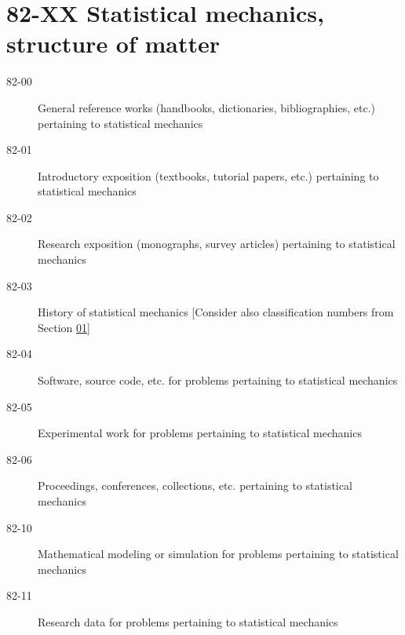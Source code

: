 \documentclass[letterpaper]{article}
\begin{document}
\section*{82-XX Statistical mechanics, structure of matter }\label{82-XX}
\begin{description}
\item [82-00]\label{82-00} General reference works (handbooks, dictionaries, bibliographies, etc.) pertaining to statistical mechanics
\item [82-01]\label{82-01} Introductory exposition (textbooks, tutorial papers, etc.) pertaining to statistical mechanics
\item [82-02]\label{82-02} Research exposition (monographs, survey articles) pertaining to statistical mechanics
\item [82-03]\label{82-03} History of statistical mechanics [Consider also classification numbers from Section \hyperref[01-XX]{01}]
\item [82-04]\label{82-04} Software, source code, etc. for problems pertaining to statistical mechanics
\item [82-05]\label{82-05} Experimental work for problems pertaining to statistical mechanics
\item [82-06]\label{82-06} Proceedings, conferences, collections, etc. pertaining to statistical mechanics
\item [82-10]\label{82-10} Mathematical modeling or simulation for problems pertaining to statistical mechanics
\item [82-11]\label{82-11} Research data for problems pertaining to statistical mechanics
\end{description}
\end{document}
